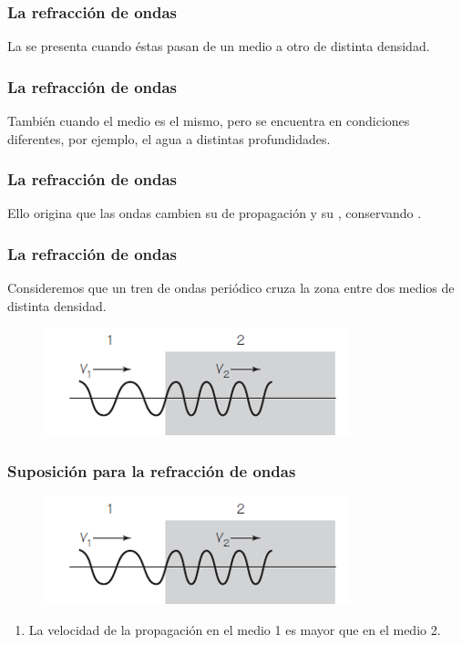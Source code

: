 \documentclass[14pt]{beamer}
\begin{document}
\begin{frame}
\frametitle{La refracción de ondas}
La  se presenta cuando éstas pasan de un medio a otro de \textcolor{bistre}{distinta densidad}.
\end{frame}
\begin{frame}
\frametitle{La refracción de ondas}
También cuando el medio es el mismo, pero se encuentra en condiciones diferentes, \pause por ejemplo, el agua a distintas profundidades.
\end{frame}
\begin{frame}
\frametitle{La refracción de ondas}
Ello origina que las ondas cambien su  de propagación y su , conservando .
\end{frame}
\begin{frame}
\frametitle{La refracción de ondas}
Consideremos que un tren de ondas periódico cruza la zona entre dos medios de distinta densidad.
\begin{figure}
    \centering
    \includegraphics[scale=1]{Imagenes/Refraccion_Ondas_02.png}
\end{figure}
\end{frame}
\begin{frame}
\frametitle{Suposición para la refracción de ondas}    
\begin{figure}
    \centering
    \includegraphics[scale=1]{Imagenes/Refraccion_Ondas_02.png}
\end{figure}
\begin{enumerate}[<+->]
\item La velocidad de la propagación en el medio 1 es mayor que en el medio 2.
\seti
\end{enumerate}
\end{frame}
\end{document}
